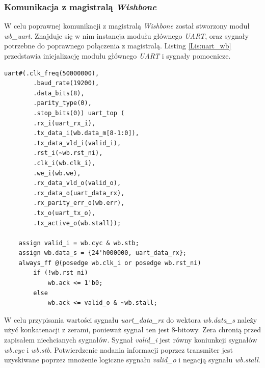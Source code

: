 \documentclass[11pt,a4paper]{article}
\begin{document}
	\subsubsection{Komunikacja z magistralą \textit{Wishbone}}
		\hspace{5mm} W celu poprawnej komunikacji z magistralą \textit{Wishbone} został stworzony moduł \textit{wb\_uart}. Znajduje się w nim instancja modułu głównego \textit{UART}, oraz sygnały potrzebne do poprawnego połączenia z magistralą. Listing \ref{Lis:uart_wb} przedstawia inicjalizację modułu głównego \textit{UART} i sygnały pomocnicze.	\\	
\begin{minipage}{\textwidth}
\begin{scriptsize}
\begin{lstlisting}[label=Lis:uart_wb,caption=Model \textit{GPIO}]
	uart#(.clk_freq(50000000),
		.baud_rate(19200),
		.data_bits(8),
		.parity_type(0),
		.stop_bits(0)) uart_top (
		.rx_i(uart_rx_i),
		.tx_data_i(wb.data_m[8-1:0]),
		.tx_data_vld_i(valid_i),
		.rst_i(~wb.rst_ni),
		.clk_i(wb.clk_i),
		.we_i(wb.we),
		.rx_data_vld_o(valid_o),
		.rx_data_o(uart_data_rx),
		.rx_parity_err_o(wb.err),
		.tx_o(uart_tx_o),
		.tx_active_o(wb.stall));

	assign valid_i = wb.cyc & wb.stb;
	assign wb.data_s = {24'h000000, uart_data_rx};  
	always_ff @(posedge wb.clk_i or posedge wb.rst_ni)
		if (!wb.rst_ni)
			wb.ack <= 1'b0;
		else
			wb.ack <= valid_o & ~wb.stall;
\end{lstlisting}
\end{scriptsize}
\end{minipage}		
		W celu przypisania wartości sygnału \textit{uart\_data\_rx} do wektora \textit{wb.data\_s} należy użyć konkatenacji z zerami, ponieważ sygnał ten jest 8-bitowy. Zera chronią przed zapisałem niechcianych sygnałów. Sygnał \textit{valid\_i} jest równy koniunkcji sygnałów \textit{wb.cyc} i \textit{wb.stb}. Potwierdzenie nadania informacji poprzez transmiter jest uzyskiwane poprzez mnożenie logiczne sygnału \textit{valid\_o} i negacją sygnału \textit{wb.stall}.
\end{document}
